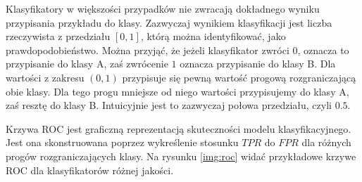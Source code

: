 \documentclass[a4paper, twoside, 11pt, openright]{article}
\begin{document}
Klasyfikatory w większości przypadków nie zwracają dokładnego wyniku przypisania przykładu do klasy. Zazwyczaj wynikiem klasyfikacji jest liczba rzeczywista z przedziału $[0, 1]$, którą można identyfikować, jako prawdopodobieństwo. Można przyjąć, że jeżeli klasyfikator zwróci $0$, oznacza to przypisanie do klasy A, zaś zwrócenie $1$ oznacza przypisanie do klasy B. Dla wartości z zakresu $(0, 1)$ przypisuje się pewną wartość progową rozgraniczającą obie klasy. Dla tego progu mniejsze od niego wartości przypisujemy do klasy A, zaś resztę do klasy B. Intuicyjnie jest to zazwyczaj połowa przedziału, czyli $0.5$.

Krzywa ROC jest graficzną reprezentacją skuteczności modelu klasyfikacyjnego. Jest ona skonstruowana poprzez wykreślenie stosunku $TPR$ do $FPR$ dla różnych progów rozgraniczających klasy. Na rysunku \ref{img:roc} widać przykładowe krzywe ROC dla klasyfikatorów różnej jakości.
\end{document}
